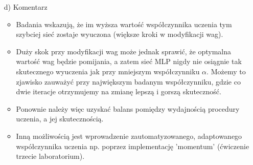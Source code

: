 \documentclass[17pt]{article}
\begin{document}
\begin{enumerate}
\item[d)] Komentarz

\begin{itemize}
\item Badania wskazują, że im wyższa wartość współczynnika uczenia tym szybciej sieć zostaje wyuczona (większe kroki w modyfikacji wag).
\item Duży skok przy modyfikacji wag może jednak sprawić, że optymalna wartość wag będzie pomijania, a zatem sieć MLP nigdy nie osiągnie tak skutecznego wyuczenia jak przy mniejszym współczynniku $\alpha$. Możemy to zjawisko zauważyć przy największym badanym współczynniku, gdzie co dwie iteracje otrzymujemy na zmianę lepszą i gorszą skuteczność.
\item Ponownie należy więc uzyskać balans pomiędzy wydajnością procedury uczenia, a jej skutecznością.
\item Inną możliwością jest wprowadzenie zautomatyzowanego, adaptowanego współczynnika uczenia np. poprzez implementację 'momentum' (ćwiczenie trzecie laboratorium).
\end{itemize}

\end{enumerate}
\newpage
\end{document}

